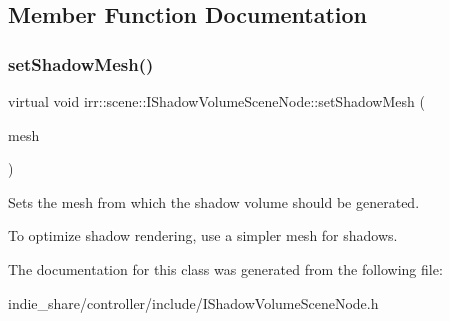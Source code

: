 \subsection{Member Function Documentation}
\mbox{\label{classirr_1_1scene_1_1IShadowVolumeSceneNode_a69af3aa713c909106bacccdbab01184d}} 
\subsubsection{\texorpdfstring{set\+Shadow\+Mesh()}{setShadowMesh()}}
{\footnotesize\ttfamily virtual void irr\+::scene\+::\+I\+Shadow\+Volume\+Scene\+Node\+::set\+Shadow\+Mesh (\begin{DoxyParamCaption}\item[{const \hyperlink{classirr_1_1scene_1_1IMesh}{I\+Mesh} $\ast$}]{mesh }\end{DoxyParamCaption})\hspace{0.3cm}{\ttfamily [pure virtual]}}



Sets the mesh from which the shadow volume should be generated. 

To optimize shadow rendering, use a simpler mesh for shadows. 

The documentation for this class was generated from the following file\+:\begin{DoxyCompactItemize}
\item 
indie\+\_\+share/controller/include/I\+Shadow\+Volume\+Scene\+Node.\+h\end{DoxyCompactItemize}
